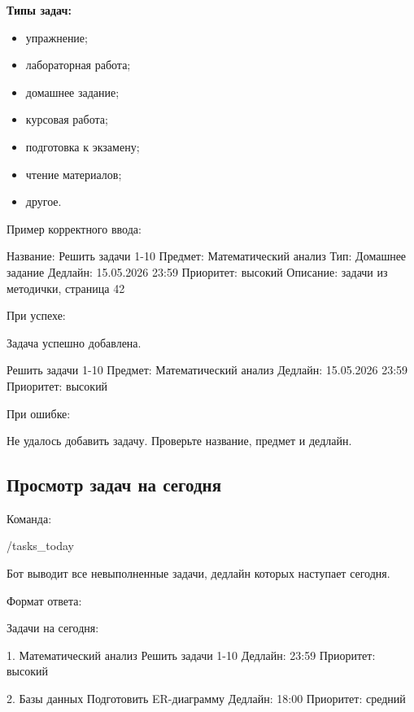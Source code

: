 \documentclass[10pt,a4paper,final]{article} %
\begin{document}
\textbf{Типы задач:}

\begin{itemize}
    \item упражнение;
    \item лабораторная работа;
    \item домашнее задание;
    \item курсовая работа;
    \item подготовка к экзамену;
    \item чтение материалов;
    \item другое.
\end{itemize}

Пример корректного ввода:

\begin{Code}
Название: Решить задачи 1-10
Предмет: Математический анализ
Тип: Домашнее задание
Дедлайн: 15.05.2026 23:59
Приоритет: высокий
Описание: задачи из методички, страница 42
\end{Code}

При успехе:

\begin{Code}
Задача успешно добавлена.

Решить задачи 1-10
Предмет: Математический анализ
Дедлайн: 15.05.2026 23:59
Приоритет: высокий
\end{Code}

При ошибке:

\begin{Code}
Не удалось добавить задачу. Проверьте название, предмет и дедлайн.
\end{Code}

\subsection{Просмотр задач на сегодня}

Команда:

\begin{Code}
/tasks_today
\end{Code}

Бот выводит все невыполненные задачи, дедлайн которых наступает сегодня.

Формат ответа:

\begin{Code}
Задачи на сегодня:

1. Математический анализ
Решить задачи 1-10
Дедлайн: 23:59
Приоритет: высокий

2. Базы данных
Подготовить ER-диаграмму
Дедлайн: 18:00
Приоритет: средний
\end{Code}
\end{document}
